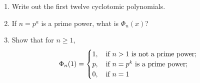 \begin{exercise}
    \begin{enumerate}[label=(\alph*)]
        \item Write out the first twelve cyclotomic polynomials.
        \item If $n=p^a$ is a prime power, what is $\Phi_n(x)$?
        \item Show that for $n\geq 1$,
        \[
            \Phi_n(1) = \begin{cases}
                1, \quad \textnormal{if $n > 1$ is not a prime power;} \\
                p, \quad \textnormal{if $n=p^k$ is a prime power;} \\
                0, \quad \textnormal{if $n=1$}
            \end{cases}
        \]
    \end{enumerate}
\end{exercise}

